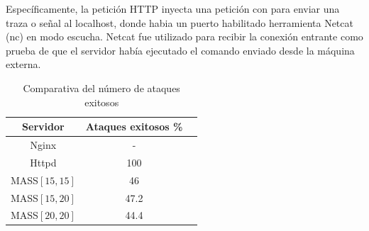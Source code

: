 Específicamente, la petición HTTP inyecta una petición con \cite{netcat} para enviar una traza o señal al localhost, donde habia un puerto habilitado herramienta Netcat (nc) en modo escucha. Netcat fue utilizado para recibir la conexión entrante como prueba de que el servidor había ejecutado el comando enviado desde la máquina externa.

\begin{table}[H]
    \centering
    \begin{tabular}{|c|c|c|}
        \hline
        \textbf{Servidor} & \textbf{Ataques exitosos \%} \\ 
        \hline
        Nginx & - \\ 
        Httpd & 100 \\ 
        MASS$[15,15]$ & 46 \\ 
        MASS$[15,20]$ & 47.2 \\ 
        MASS$[20,20]$ & 44.4 \\ 
        \hline
    \end{tabular}
    \caption{Comparativa del número de ataques exitosos}
    \end{table}
